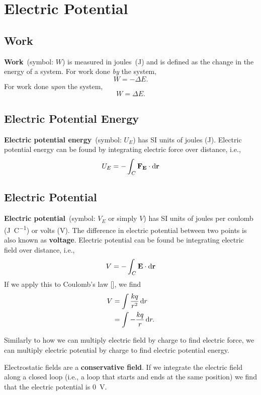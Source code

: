 \chapter{Electric Potential}

\section{Work}

\textbf{Work}~(symbol: \(W\)) is measured in joules~(\unit{\joule})
and is defined as the change in the energy of a system.
For work done \emph{by} the system,
\begin{equation}
    W = - \Delta E.
\end{equation}
For work done \emph{upon} the system,
\begin{equation}
    W = \Delta E.
\end{equation}

\section{Electric Potential Energy}

\textbf{Electric potential energy}~(symbol: \(U_E\))
has SI units of joules (\unit{\joule}).
Electric potential energy can be found by integrating electric force
over distance,
i.e.,
\begin{equation}
    U_E = - \int_C \vec{F_E} \cdot \odif{\vec{r}}
\end{equation}

\section{Electric Potential} \label{sec:electric-potential}

\textbf{Electric potential}~(symbol: \(V_E\) or simply \(V\))
has SI units of joules per coulomb (\unit{\joule \per \coulomb})
or volts (\unit{\volt}).
The difference in electric potential between two points
is also known as \textbf{voltage}.
Electric potential can be found be integrating electric field over distance,
i.e.,
\begin{equation}
    V = - \int_C \vec{E} \cdot \odif{\vec{r}}
\end{equation}
If we apply this to Coulomb's law [],
we find
\begin{gather}
    \begin{aligned}
        V &= \int \frac{k q}{r^2} \odif{r} \\
        &= \int - \frac{k q}{r} \odif{r}.
    \end{aligned}
\end{gather}

Similarly to how we can multiply electric field by charge
to find electric force,
we can multiply electric potential by charge to find electric potential energy.

Electrostatic fields are a \textbf{conservative field}.
If we integrate the electric field along a closed loop
(i.e., a loop that starts and ends at the same position)
we find that the electric potential is \qty{0}{\volt}.
